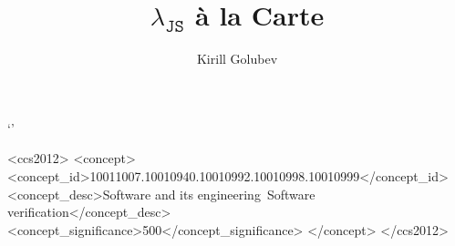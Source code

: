 \documentclass[sigplan,nonacm]{acmart}
\begin{document}
\title{$\lambda_{\texttt{JS}}$ à la Carte}
`'

\author{Kirill Golubev}


\renewcommand{\shortauthors}{Golubev}

\begin{CCSXML}
<ccs2012>
 <concept>
<concept_id>10011007.10010940.10010992.10010998.10010999</concept_id>
<concept_desc>Software and its engineering~Software verification</concept_desc>
<concept_significance>500</concept_significance>
</concept>
</ccs2012>
\end{CCSXML}




\maketitle
\end{document}
